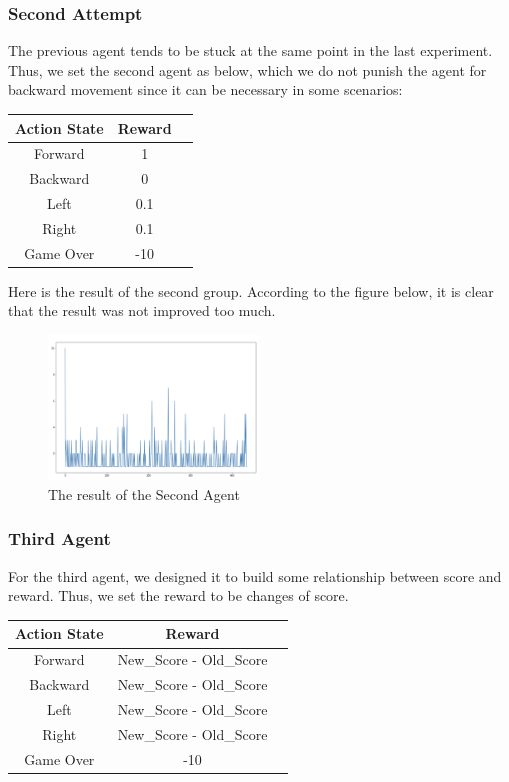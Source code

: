 \documentclass{article}
\begin{document}
\subsubsection{Second Attempt}
The previous agent tends to be stuck at the same point in the last experiment. Thus, we set the second agent as below, which we do not punish the agent for backward movement since it can be necessary in some scenarios:

\begin{center}
\begin{tabular}{ | c | c| c | } 
\hline
Action State & Reward\\ 
\hline
Forward & 1\\ 
\hline
Backward & 0\\ 
\hline
Left & 0.1\\ 
\hline
Right & 0.1\\ 
\hline
Game Over & -10\\ 
\hline
\end{tabular}
\end{center}

Here is the result of the second group. According to the figure below, it is clear that the result was not improved too much. 


\begin{figure}[h]
\caption{The result of the Second Agent}
\centering
\includegraphics[width=0.5\textwidth]{SecondAgent.png}
\end{figure}

\subsubsection{Third Agent}
For the third agent, we designed it to build some relationship between score and reward. Thus, we set the reward to be changes of score.


\begin{center}
\begin{tabular}{ | c | c| c | } 
\hline
Action State & Reward\\ 
\hline
Forward & New\_Score - Old\_Score\\ 
\hline
Backward & New\_Score - Old\_Score\\ 
\hline
Left & New\_Score - Old\_Score\\ 
\hline
Right & New\_Score - Old\_Score\\ 
\hline
Game Over & -10\\ 
\hline
\end{tabular}
\end{center}
\end{document}
